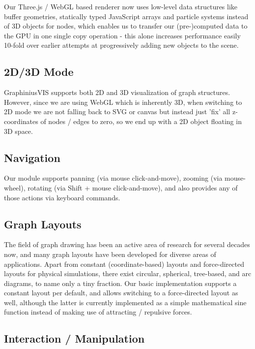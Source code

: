 	Our Three.js / WebGL based renderer now uses low-level data structures like buffer geometries, statically typed JavaScript arrays and particle systems instead of 3D objects for nodes, which enables us to transfer our (pre-)computed data to the GPU in one single copy operation - this alone increases performance easily 10-fold over earlier attempts at progressively adding new objects to the scene.
	
	\subsection{2D/3D Mode}
	\label{ssect:vis_2d3d}
	
	GraphiniusVIS supports both 2D and 3D visualization of graph structures. However, since we are using WebGL which is inherently 3D, when switching to 2D mode we are not falling back to SVG or canvas but instead just 'fix' all z-coordinates of nodes / edges to zero, so we end up with a 2D object floating in 3D space.
	
	\subsection{Navigation}
	\label{ssect:vis_navigation}
	
	Our module supports panning (via mouse click-and-move), zooming (via mouse-wheel), rotating (via Shift + mouse click-and-move), and also provides any of those actions via keyboard commands.
	
	\subsection{Graph Layouts}
	\label{ssect:vis_layouts}
	
	The field of graph drawing has been an active area of research for several decades now, and many graph layouts have been developed for diverse areas of applications. Apart from constant (coordinate-based) layouts and force-directed layouts for physical simulations, there exist circular, spherical, tree-based, and arc diagrams, to name only a tiny fraction. Our basic implementation supports a constant layout per default, and allows switching to a force-directed layout as well, although the latter is currently implemented as a simple mathematical sine function instead of making use of attracting / repulsive forces.
	
	\subsection{Interaction / Manipulation}
	\label{ssect:vis_interact_manipulate}
	
